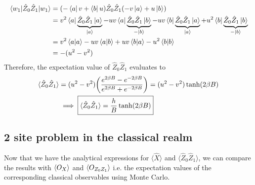 \documentclass[../thesis_main.tex]{subfiles}
\begin{document}
\begin{align*}
    \mel{w_1}{\hat{Z}_0 \hat{Z}_1}{w_1} & = (-\bra{a}v + \bra{b} u) \hat{Z}_0 \hat{Z}_1 (-v \ket{a} + u \ket{b}) \\
    & = v^2 \bra{a}\underbrace{{\hat{Z}_0 \hat{Z}_1}\ket{a}}_{\ket{a}} -  uv \bra{a}\underbrace{{\hat{Z}_0 \hat{Z}_1}\ket{b}}_{-\ket{b}} - uv \bra{b}\underbrace{{\hat{Z}_0 \hat{Z}_1}\ket{a}}_{\ket{a}} + u^2 \bra{b}\underbrace{{\hat{Z}_0 \hat{Z}_1}\ket{b}}_{-\ket{b}} \\ 
    & = v^2 \braket{a}{a} - uv \braket{a}{b} + uv \braket{b}{a} - u^2\braket{b}{b} \\
    & = -(u^2 - v^2)
\end{align*}
Therefore, the expectation value of $\hat{Z}_0 \hat{Z}_1$ evaluates to 
\begin{align}
    \langle \hat{Z}_0 \hat{Z}_1 \rangle & = (u^2-v^2) \qty(\frac{e^{2\beta B} - e^{-2\beta B}}{e^{2\beta B} + e^{-2\beta B}}) = (u^2-v^2) \tanh (2\beta B) \nonumber \\ 
    & \implies \boxed{\langle{\hat{Z}_0 \hat{Z}_1}\rangle = \frac{h}{B} \tanh(2\beta B)}
    \label{ZZ-hat_expval}
\end{align}

\subsection{2 site problem in the classical realm}
Now that we have the analytical expressions for $\langle \hat{X} \rangle$ and $\langle \hat{Z}_0 \hat{Z}_1 \rangle$, we can compare the results with $\expval{O_{X}}$ and $\expval{O_{Z_0 Z_1}}$ i.e. the expectation values of the corresponding classical observables using Monte Carlo.
\end{document}
